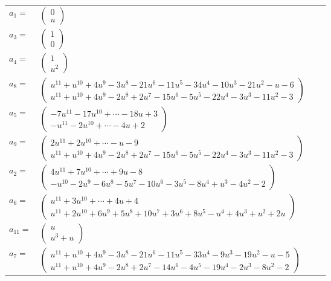 \documentclass[1p]{elsarticle_modified}
\theoremstyle{definition}
\begin{document}
\begin{tabular}{m{7pt} m{180pt} m{7pt} m{180pt} }
\flushright $a_{1}=$&$\begin{pmatrix}0\\u\end{pmatrix}$ \\
\flushright $a_{3}=$&$\begin{pmatrix}1\\0\end{pmatrix}$ \\
\flushright $a_{4}=$&$\begin{pmatrix}1\\u^2\end{pmatrix}$ \\
\flushright $a_{8}=$&$\begin{pmatrix}u^{11}+u^{10}+4 u^9-3 u^8-21 u^6-11 u^5-34 u^4-10 u^3-21 u^2- u-6\\u^{11}+u^{10}+4 u^9-2 u^8+2 u^7-15 u^6-5 u^5-22 u^4-3 u^3-11 u^2-3\end{pmatrix}$ \\
\flushright $a_{5}=$&$\begin{pmatrix}-7 u^{11}-17 u^{10}+\cdots-18 u+3\\- u^{11}-2 u^{10}+\cdots-4 u+2\end{pmatrix}$ \\
\flushright $a_{9}=$&$\begin{pmatrix}2 u^{11}+2 u^{10}+\cdots- u-9\\u^{11}+u^{10}+4 u^9-2 u^8+2 u^7-15 u^6-5 u^5-22 u^4-3 u^3-11 u^2-3\end{pmatrix}$ \\
\flushright $a_{2}=$&$\begin{pmatrix}4 u^{11}+7 u^{10}+\cdots+9 u-8\\- u^{10}-2 u^9-6 u^8-5 u^7-10 u^6-3 u^5-8 u^4+u^3-4 u^2-2\end{pmatrix}$ \\
\flushright $a_{6}=$&$\begin{pmatrix}u^{11}+3 u^{10}+\cdots+4 u+4\\u^{11}+2 u^{10}+6 u^9+5 u^8+10 u^7+3 u^6+8 u^5- u^4+4 u^3+u^2+2 u\end{pmatrix}$ \\
\flushright $a_{11}=$&$\begin{pmatrix}u\\u^3+u\end{pmatrix}$ \\
\flushright $a_{7}=$&$\begin{pmatrix}u^{11}+u^{10}+4 u^9-3 u^8-21 u^6-11 u^5-33 u^4-9 u^3-19 u^2- u-5\\u^{11}+u^{10}+4 u^9-2 u^8+2 u^7-14 u^6-4 u^5-19 u^4-2 u^3-8 u^2-2\end{pmatrix}$ \\

\end{tabular}
\end{document}
